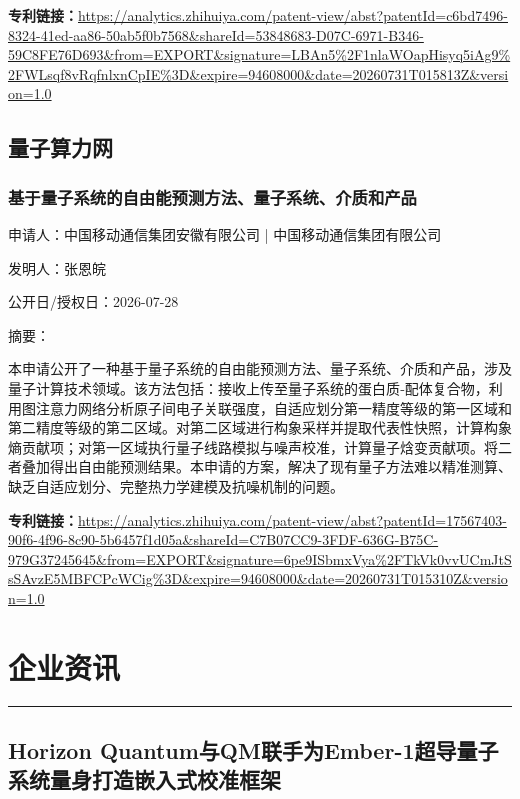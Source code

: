\documentclass[12pt,a4paper]{ctexart}
\begin{document}
\noindent\textbf{专利链接：}\url{https://analytics.zhihuiya.com/patent-view/abst?patentId=c6bd7496-8324-41ed-aa86-50ab5f0b7568&shareId=53848683-D07C-6971-B346-59C8FE76D693&from=EXPORT&signature=LBAn5%2F1nlaWOapHisyq5iAg9%2FWLsqf8vRqfnlxnCpIE%3D&expire=94608000&date=20260731T015813Z&version=1.0}


\subsection{ 量子算力网 }

\subsubsection{ 基于量子系统的自由能预测方法、量子系统、介质和产品 }

申请人：中国移动通信集团安徽有限公司 | 中国移动通信集团有限公司

发明人：张恩皖

公开日/授权日：2026-07-28

摘要：

本申请公开了一种基于量子系统的自由能预测方法、量子系统、介质和产品，涉及量子计算技术领域。该方法包括：接收上传至量子系统的蛋白质‑配体复合物，利用图注意力网络分析原子间电子关联强度，自适应划分第一精度等级的第一区域和第二精度等级的第二区域。对第二区域进行构象采样并提取代表性快照，计算构象熵贡献项；对第一区域执行量子线路模拟与噪声校准，计算量子焓变贡献项。将二者叠加得出自由能预测结果。本申请的方案，解决了现有量子方法难以精准测算、缺乏自适应划分、完整热力学建模及抗噪机制的问题。

\noindent\textbf{专利链接：}\url{https://analytics.zhihuiya.com/patent-view/abst?patentId=17567403-90f6-4f96-8c90-5b6457f1d05a&shareId=C7B07CC9-3FDF-636G-B75C-979G37245645&from=EXPORT&signature=6pe9ISbmxVya%2FTkVk0vvUCmJtSsSAvzE5MBFCPcWCig%3D&expire=94608000&date=20260731T015310Z&version=1.0}




\newpage
\section{企业资讯}
\vspace{-0.5em}
\noindent\rule{\linewidth}{1.5pt}

\subsection{ Horizon Quantum与QM联手为Ember-1超导量子系统量身打造嵌入式校准框架 }
\end{document}
